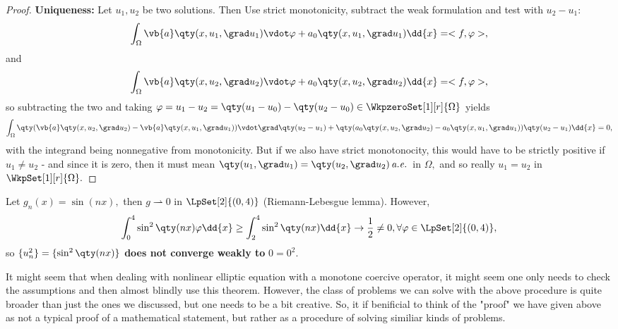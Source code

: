 \begin{proof}
	\textbf{Uniqueness:} Let $u_1, u_2$ be two solutions. Then Use strict monotonicity, subtract the weak formulation and test with $u_2-u_1$:
	\[
		\int_{\Omega}\vb{a}\qty(x, u_1, \grad u_1)\vdot \varphi + a_0\qty(x, u_1, \grad u_1)\dd{x} = <f, \varphi>,
	\]
	and
	\[
		\int_{\Omega}\vb{a}\qty(x, u_2, \grad u_2)\vdot \varphi + a_0\qty(x, u_2, \grad u_2)\dd{x} = <f, \varphi>,
	\]
so subtracting the two and taking $\varphi = u_1 - u_2 = \qty(u_1 - u_0) - \qty(u_2 - u_0) \in \WkpzeroSet[1][r]{\Omega}$ yields
	\[
		\int_{\Omega}\qty(\vb{a}\qty(x, u_2, \grad u_2)-\vb{a}\qty(x, u_1, \grad u_1))\vdot \grad\qty(u_2 - u_1)+\qty(a_0\qty(x, u_2, \grad u_2)-a_0\qty(x, u_1, \grad u_1))\qty(u_2-u_1)\dd{x} =0,
	\]
	with the integrand being nonnegative from monotonicity. But if we also have strict monotonocity, this would have to be strictly positive if $u_1 \neq u_2$ - and since it is zero, then it must mean $\qty(u_1, \grad u_1) = \qty(u_2, \grad u_2) \, \text{\textit{a.e.}} \,$ in $\Omega,$ and so really $u_1 = u_2$ in $\WkpSet[1][r]{\Omega}.$
\end{proof}
\begin{example}
	Let $g_n(x) = \sin(nx), $ then $g \rightharpoonup 0$ in $\LpSet[2]{(0,4)}$ (Riemann-Lebesgue lemma). However,
	\[
		\int_0^4 \sin^{2}\qty(nx)\varphi \dd{x} \geq \int_2^4 \sin^{2}\qty(nx)\dd{x} \to \frac{1}{2} \neq 0, \forall \varphi \in \LpSet[2]{(0,4)},
	\]
	so $\{u_n^{2}\} = \{\sin^{2}\qty(nx)\}$ \textbf{does not converge weakly to } $0 = 0^{2}$.
\end{example}
\begin{remark}
	It might seem that when dealing with nonlinear elliptic equation with a monotone coercive operator, it might seem one only needs to check the assumptions and then almost blindly use this theorem. However, the class of problems we can solve with the above procedure is quite broader than just the ones we discussed, but one needs to be a bit creative. So, it if benificial to think of the "proof" we have given above as not a typical proof of a mathematical statement, but rather as a procedure of solving similiar kinds of problems.
\end{remark}

